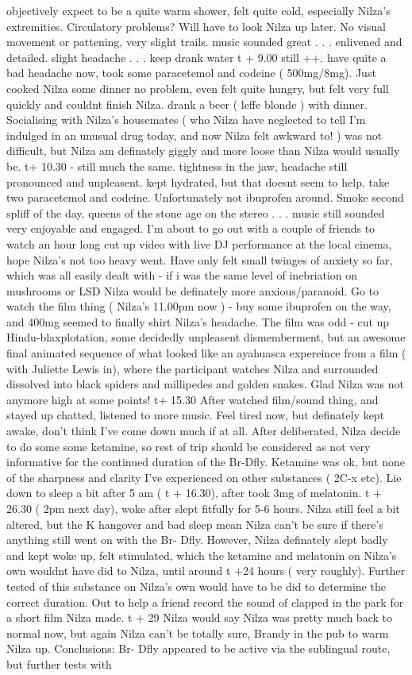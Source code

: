 \documentclass[12pt]{book}
\begin{document}
objectively expect to be a quite warm shower, felt quite cold, especially Nilza's extremities. Circulatory problems? Will have to look Nilza up later. No visual movement or pattening, very slight trails. music sounded great . . .  enlivened and detailed. slight headache . . .  keep drank water t + 9.00 still ++. have quite a bad headache now, took some paracetemol and codeine ( 500mg/8mg). Just cooked Nilza some dinner no problem, even felt quite hungry, but felt very full quickly and couldnt finish Nilza. drank a beer ( leffe blonde ) with dinner. Socialising with Nilza's housemates ( who Nilza have neglected to tell I'm indulged in an unusual drug today, and now Nilza felt awkward to! ) was not difficult, but Nilza am definately giggly and more loose than Nilza would usually be. t+ 10.30 - still much the same. tightness in the jaw, headache still pronounced and unpleasent. kept hydrated, but that doesnt seem to help. take two paracetemol and codeine. Unfortunately not ibuprofen around. Smoke second spliff of the day. queens of the stone age on the stereo . . .  music still sounded very enjoyable and engaged. I'm about to go out with a couple of friends to watch an hour long cut up video with live DJ performance at the local cinema, hope Nilza's not too heavy went. Have only felt small twinges of anxiety so far, which was all easily dealt with - if i was the same level of inebriation on mushrooms or LSD Nilza would be definately more anxious/paranoid. Go to watch the film thing ( Nilza's 11.00pm now ) - buy some ibuprofen on the way, and 400mg seemed to finally shirt Nilza's headache. The film was odd - cut up Hindu-blaxplotation, some decidedly unpleasent dismemberment, but an awesome final animated sequence of what looked like an ayahuasca expereince from a film ( with Juliette Lewis in), where the participant watches Nilza and surrounded dissolved into black spiders and millipedes and golden snakes. Glad Nilza was not anymore high at some points! t+ 15.30 After watched film/sound thing, and stayed up chatted, listened to more music. Feel tired now, but definately kept awake, don't think I've come down much if at all. After deliberated, Nilza decide to do some some ketamine, so rest of trip should be considered as not very informative for the continued duration of the Br-Dfly. Ketamine was ok, but none of the sharpness and clarity I've experienced on other substances ( 2C-x etc). Lie down to sleep a bit after 5 am ( t + 16.30), after took 3mg of melatonin. t + 26.30 ( 2pm next day), woke after slept fitfully for 5-6 hours. Nilza still feel a bit altered, but the K hangover and bad sleep mean Nilza can't be sure if there's anything still went on with the Br- Dfly. However, Nilza definately slept badly and kept woke up, felt stimulated, which the ketamine and melatonin on Nilza's own wouldnt have did to Nilza, until around t +24 hours ( very roughly). Further tested of this substance on Nilza's own would have to be did to determine the correct duration. Out to help a friend record the sound of clapped in the park for a short film Nilza made. t + 29 Nilza would say Nilza was pretty much back to normal now, but again Nilza can't be totally sure, Brandy in the pub to warm Nilza up. Conclusions: Br- Dfly appeared to be active via the sublingual route, but further tests with 
\end{document}
